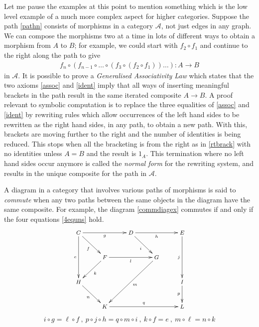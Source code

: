 \documentclass[a4paper,12pt]{article}
\theoremstyle{step}
\def\CA{{\mathscr A}}
\begin{document}
Let me pause the examples at this point to mention something which is the low level example of a much more complex aspect for higher categories. Suppose the path \eqref{pathn} consists of morphisms in
a category $\CA$, not just edges in any graph. We can compose the morphisms two at a time in lots of different ways to obtain a morphism from $A$ to $B$; for example, we could start with $f_2\circ f_1$
and continue to the right along the path to give 
\begin{eqnarray}\label{rtbrack}
f_n\circ (f_{n-1}\circ \dots \circ (f_3\circ (f_2\circ f_1))\dots ) : A\to B 
\end{eqnarray}
in $\CA$. It is possible to prove a {\em Generalised Associativity Law} which states that the two axioms
\eqref{assoc} and \eqref{ident} imply that all ways of inserting meaningful brackets in the path result in
the same iterated composite $A\to B$. A proof relevant to symbolic computation is to replace the three
equalities of \eqref{assoc} and \eqref{ident} by rewriting rules which allow occurrences of the left hand sides to be rewritten as the right hand sides, in any path, to obtain a new path. With this, brackets are moving further to the right and the number of identities is being reduced. This stops when all the bracketing is from the right as in \eqref{rtbrack} with no identities unless $A=B$ and the result is $1_A$.
This termination where no left hand sides occur anymore is called the {\em normal form} for the rewriting system, and results in the unique composite for the path in $\CA$. 

A diagram in a category that involves various paths of morphisms is said to {\em commute} when
any two paths between the same objects in the diagram have the same composite. For example,
the diagram \eqref{commdiagex} commutes if and only if the four equations \eqref{4equns} hold. 
\begin{eqnarray}\label{commdiagex}
\begin{aligned}
\footnotesize{\xymatrix{
C \ar[dd]_-{e} \ar[rd]_-{f}  \ar[rr]_-{g} & & D \ar[rr]_-{h} \ar[rd]_-{i} & & E \ar[dd]_-{j}  \\
& F \ar[ld]^-{k} \ar[rr]_-{l} & & G  \ar[ldld]^-{m} \\
H \ar[rd]_{n} & & & & I \ar[d]_-{p} \\
& K  \ar[rrr]^-{q} & & & L } }
\end{aligned}
\end{eqnarray}
\begin{eqnarray}\label{4equns}
i\circ g = \ell\circ f \ , \ p\circ j\circ h = q \circ m \circ i \ , \ k \circ f = e \ , \ m \circ \ell = n\circ k 
\end{eqnarray}
\end{document}
